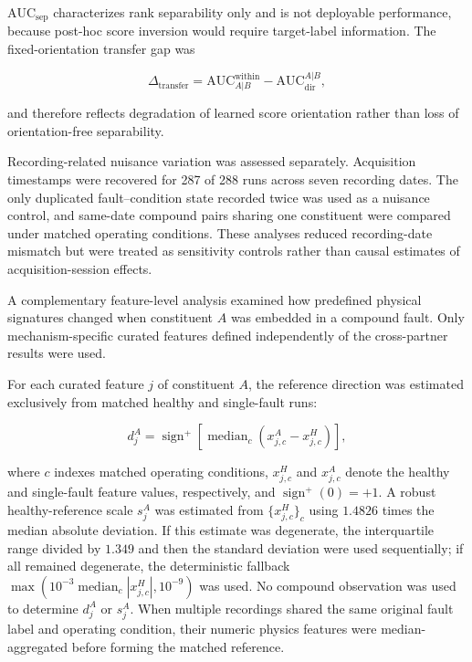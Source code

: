 \documentclass{ieeeaccess}
\begin{document}
$\mathrm{AUC}_{\mathrm{sep}}$ characterizes rank separability only and is not
deployable performance, because post-hoc score inversion would require
target-label information. The fixed-orientation transfer gap was

\begin{equation}
\Delta_{\mathrm{transfer}}
=
\mathrm{AUC}^{\mathrm{within}}_{A|B}
-
\mathrm{AUC}^{A|B}_{\mathrm{dir}},
\label{eq:transfer_gap}
\end{equation}

and therefore reflects degradation of learned score orientation rather than
loss of orientation-free separability.

Recording-related nuisance variation was assessed separately. Acquisition
timestamps were recovered for 287 of 288 runs across seven recording dates.
The only duplicated fault--condition state recorded twice was used as a
nuisance control, and same-date compound pairs sharing one constituent were
compared under matched operating conditions. These analyses reduced
recording-date mismatch but were treated as sensitivity controls rather than
causal estimates of acquisition-session effects.

A complementary feature-level analysis examined how predefined physical
signatures changed when constituent $A$ was embedded in a compound fault.
Only mechanism-specific curated features defined independently of the
cross-partner results were used.

For each curated feature $j$ of constituent $A$, the reference direction was
estimated exclusively from matched healthy and single-fault runs:

\begin{equation}
d_j^{A}
=
\operatorname{sign}^{+}
\left[
\operatorname{median}_{c}
\left(
x_{j,c}^{A}-x_{j,c}^{H}
\right)
\right],
\label{eq:signature_direction}
\end{equation}

where $c$ indexes matched operating conditions, $x_{j,c}^{H}$ and
$x_{j,c}^{A}$ denote the healthy and single-fault feature values,
respectively, and $\operatorname{sign}^{+}(0)=+1$. A robust
healthy-reference scale $s_j^{A}$ was estimated from
$\{x_{j,c}^{H}\}_c$ using $1.4826$ times the median absolute deviation.
If this estimate was degenerate, the interquartile range divided by $1.349$
and then the standard deviation were used sequentially; if all remained
degenerate, the deterministic fallback
$\max(10^{-3}\operatorname{median}_{c}|x_{j,c}^{H}|,10^{-9})$
was used. No compound observation was used to determine $d_j^{A}$ or
$s_j^{A}$. When multiple recordings shared the same original fault label and operating
condition, their numeric physics features were median-aggregated before forming the matched reference.
\end{document}
